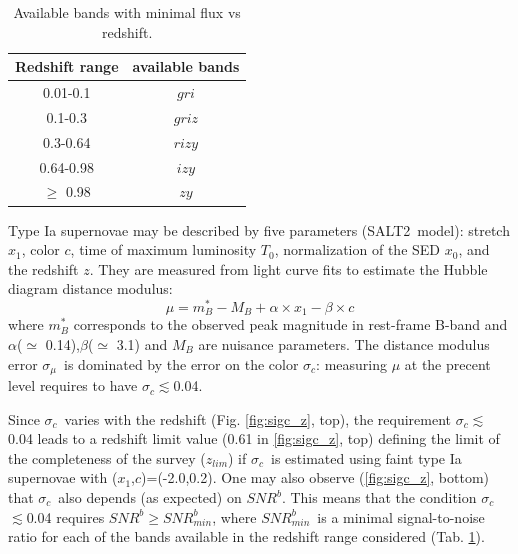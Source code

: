 \documentclass[\docopts]{\docclass}
\newcommand{\snrb}{\mbox{$SNR^b$}}
\newcommand{\snrbmin}{\mbox{$SNR^b_{min}$}}
\newcommand{\z}{{$z$}}
\newcommand{\bg}{{$g$}}
\newcommand{\br}{{$r$}}
\newcommand{\bi}{{$i$}}
\newcommand{\bz}{{$z$}}
\newcommand{\by}{{$y$}}
\newcommand{\salt}{SALT2}
\newcommand{\xnorm}{$x_0$}
\newcommand{\strech}{$x_1$}
\newcommand{\col}{$c$}
\newcommand{\daymax}{$T_0$}
\newcommand{\sigc}{\mbox{$\sigma_c$}}
\newcommand{\sigmu}{\mbox{$\sigma_\mu$}}
\newcommand{\zlim}{\mbox{$z_{lim}$}}
\begin{document}
\begin{table}[!htbp]
  \caption{Available bands with minimal flux vs redshift.}\label{tab:zfilters}
  \begin{center}
    \begin{tabular}{c|c}
      \hline
      \hline
      Redshift range & available bands \\
      \hline
      0.01-0.1 & \bg\br\bi\\
      0.1-0.3 & \bg\br\bi\bz \\
      0.3-0.64 & \br\bi\bz\by \\
      0.64-0.98 & \bi\bz\by \\
      $\geq$ 0.98 & \bz\by \\
      \hline
      \end{tabular}
  \end{center}
\end{table}

Type Ia supernovae may be described by five parameters (\salt~model): stretch\strech, color \col, time of maximum luminosity \daymax, normalization of the SED \xnorm, and the redshift \z.  They are measured from light curve fits to estimate the Hubble diagram distance modulus:
\begin{equation}
  \mu =m_B^*- M_B+\alpha \times x_1 -\beta \times c \label{eq:mu}
\end{equation}
where $m_B^*$ corresponds to the observed peak magnitude in rest-frame B-band and $\alpha$($\simeq$ 0.14),$\beta$($\simeq$ 3.1) and $M_B$ are nuisance parameters. The distance modulus error \sigmu~is dominated by the error on the color \sigc: measuring $\mu$ at the precent level  requires to have \sigc$\lesssim$0.04.

Since \sigc~varies with the redshift  (Fig. \ref{fig:sigc_z}, top), the requirement \sigc$\lesssim$0.04 leads to a redshift limit value (0.61 in \ref{fig:sigc_z}, top) defining the limit of the completeness of the survey (\zlim) if \sigc~is estimated using faint type Ia supernovae with (\strech,\col)=(-2.0,0.2). One may also observe (\ref{fig:sigc_z}, bottom) that \sigc~also depends (as expected) on \snrb. This means that the condition \sigc$\lesssim$0.04 requires \snrb$\geq$\snrbmin, where \snrbmin~is a minimal signal-to-noise ratio for each of the bands available in the redshift range considered (Tab. \ref{tab:zfilters}).
\end{document}
